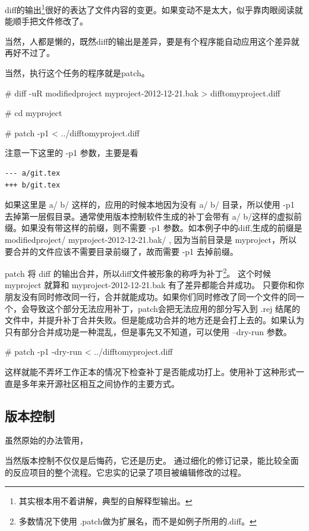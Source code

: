 diff的输出\footnote{其实根本用不着讲解，典型的自解释型输出。}很好的表达了文件内容的变更。如果变动不是太大，似乎靠肉眼阅读就能顺手把文件修改了。

当然，人都是懒的，既然diff的输出是差异，要是有个程序能自动应用这个差异就再好不过了。

当然，执行这个任务的程序就是patch。

\begin{code}
\# diff -uR modifiedproject  myproject-2012-12-21.bak > difftomyproject.diff

\# cd myproject 

\# patch -p1 < ../difftomyproject.diff
\end{code}

注意一下这里的  -p1 参数，主要是看

 {\scriptsize 
\begin{verbatim}
--- a/git.tex
+++ b/git.tex
\end{verbatim}}

如果这里是 a/ b/ 这样的，应用的时候本地因为没有 a/ b/ 目录，所以使用  -p1 去掉第一层假目录。通常使用版本控制软件生成的补丁会带有 a/ b/这样的虚拟前缀。如果没有带这样的前缀，则不需要 -p1 参数。如本例子中的diff,生成的前缀是 modifiedproject/ myproject-2012-12-21.bak/ , 因为当前目录是 myproject，所以要合并的文件应该不需要目录前缀了，故而需要 -p1 去掉前缀。

patch 将 diff 的输出合并，所以diff文件被形象的称呼为补丁\footnote{多数情况下使用 .patch做为扩展名，而不是如例子所用的.diff。}。
这个时候 myproject 就算和  myproject-2012-12-21.bak 有了差异都能合并成功。
只要你和你朋友没有同时修改同一行，合并就能成功。如果你们同时修改了同一个文件的同一个，会导致这个部分无法应用补丁，patch会把无法应用的部分写入到 .rej 结尾的文件中，并提升补丁合并失败。但是能成功合并的地方还是会打上去的。如果认为只有部分合并成功是一种混乱，但是事先又不知道，可以使用 --dry-run 参数。

\begin{code}
\# patch -p1 -dry-run < ../difftomyproject.diff
\end{code}

这样就能不弄坏工作正本的情况下检查补丁是否能成功打上。使用补丁这种形式一直是多年来开源社区相互之间协作的主要方式。

\subsection{版本控制}

虽然原始的办法管用，

当然版本控制不仅仅是后悔药，它还是历史。
通过细化的修订记录，能比较全面的反应项目的整个流程。它忠实的记录了项目被编辑修改的过程。



